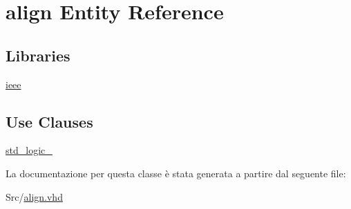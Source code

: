\hypertarget{classalign}{\section{align Entity Reference}
\label{classalign}
}
\subsection*{Libraries}
 \begin{DoxyCompactItemize}
\item 
\hypertarget{classalign_a0a6af6eef40212dbaf130d57ce711256}{\hyperlink{classalign_a0a6af6eef40212dbaf130d57ce711256}{ieee} }\label{classalign_a0a6af6eef40212dbaf130d57ce711256}

\end{DoxyCompactItemize}
\subsection*{Use Clauses}
 \begin{DoxyCompactItemize}
\item 
\hypertarget{classalign_acd03516902501cd1c7296a98e22c6fcb}{\hyperlink{classalign_acd03516902501cd1c7296a98e22c6fcb}{std\+\_\+logic\+\_}   }\label{classalign_acd03516902501cd1c7296a98e22c6fcb}

\end{DoxyCompactItemize}


La documentazione per questa classe è stata generata a partire dal seguente file\+:\begin{DoxyCompactItemize}
\item 
Src/\hyperlink{align_8vhd}{align.\+vhd}\end{DoxyCompactItemize}
